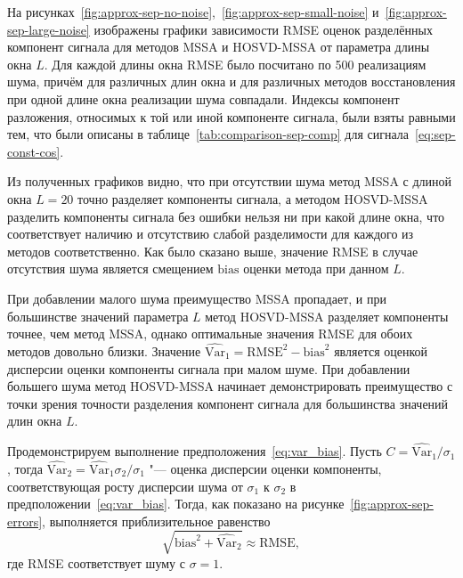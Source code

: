 \documentclass[specialist,
    substylefile = spbu.rtx,
    subf,href,colorlinks=true, 12pt]{disser}
\theoremstyle{plain}
\theoremstyle{definition}
\theoremstyle{remark}
\begin{document}
    На рисунках~\ref{fig:approx-sep-no-noise},~\ref{fig:approx-sep-small-noise} и~\ref{fig:approx-sep-large-noise}
    изображены графики зависимости RMSE оценок разделённых компонент сигнала для методов MSSA и HOSVD-MSSA от
    параметра длины окна $L$.
    Для каждой длины окна RMSE было посчитано по 500 реализациям шума, причём для различных длин окна
    и для различных методов восстановления при одной длине окна реализации шума совпадали.
    Индексы компонент разложения, относимых к той или иной компоненте сигнала, были взяты равными тем, что
    были описаны в таблице~\ref{tab:comparison-sep-comp} для сигнала~\eqref{eq:sep-const-cos}.

    Из полученных графиков видно, что при отсутствии шума метод MSSA с длиной окна $L=20$ точно разделяет
    компоненты сигнала, а методом HOSVD-MSSA разделить компоненты сигнала без ошибки нельзя ни при какой длине окна,
    что соответствует наличию и отсутствию слабой разделимости для каждого из методов соответственно.
    Как было сказано выше, значение RMSE в случае отсутствия шума является смещением $\mathrm{bias}$
    оценки метода при данном $L$.

    При добавлении малого шума преимущество MSSA пропадает, и при большинстве значений параметра $L$ метод
    HOSVD-MSSA разделяет компоненты точнее, чем метод MSSA, однако оптимальные значения RMSE для обоих методов
    довольно близки.
    Значение $\widehat{\mathrm{Var}}_1 = \mathrm{RMSE}^2 - \mathrm{bias}^2$ является оценкой дисперсии оценки компоненты сигнала при
    малом шуме.
    При добавлении большего шума метод HOSVD-MSSA начинает демонстрировать преимущество с точки зрения точности
    разделения компонент сигнала для большинства значений длин окна $L$.


    Продемонстрируем выполнение предположения~\eqref{eq:var_bias}.
    Пусть $C=\widehat{\mathrm{Var}}_1 / \sigma_1$,
    тогда $\widehat{\mathrm{Var}}_2 = \widehat{\mathrm{Var}}_1 \sigma_2 / \sigma_1$ "--- оценка дисперсии
    оценки компоненты, соответствующая росту дисперсии шума от $\sigma_1$ к $\sigma_2$ в
    предположении~\eqref{eq:var_bias}.
    Тогда, как показано на рисунке~\ref{fig:approx-sep-errors}, выполняется приблизительное равенство
    \[
        \sqrt{\mathrm{bias}^2 + \widehat{\mathrm{Var}}_2} \approx \mathrm{RMSE},
    \]
    где RMSE соответствует шуму с $\sigma = 1$.
\end{document}
